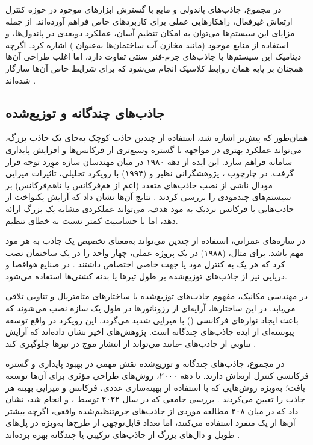در مجموع، جاذب‌های پاندولی و مایع با گسترش ابزارهای موجود در حوزه کنترل ارتعاش غیرفعال، راهکارهایی عملی برای کاربردهای خاص فراهم آورده‌اند. از جمله مزایای این سیستم‌ها می‌توان به امکان تنظیم آسان، عملکرد دوبعدی در پاندول‌ها، و استفاده از منابع موجود (مانند مخازن آب ساختمان‌ها به‌عنوان ) اشاره کرد. اگرچه دینامیک این سیستم‌ها با جاذب‌های جرم-فنر سنتی تفاوت دارد، اما اغلب طراحی آن‌ها همچنان بر پایه همان روابط کلاسیک انجام می‌شود که برای شرایط خاص آن‌ها سازگار شده‌اند \cite{sun1995properties, zhang2022understanding, kashani2018numerical, frandsen2005numerical, zhang2015nonlinear}.

\subsection{جاذب‌های چندگانه و توزیع‌شده}

همان‌طور که پیش‌تر اشاره شد، استفاده از چندین جاذب کوچک به‌جای یک جاذب بزرگ، می‌تواند عملکرد بهتری در مواجهه با گستره وسیع‌تری از فرکانس‌ها و افزایش پایداری سامانه فراهم سازد. این ایده از دهه ۱۹۸۰ در میان مهندسان سازه مورد توجه قرار گرفت. در چارچوب ، پژوهشگرانی نظیر  و  (۱۹۹۴) با رویکرد تحلیلی، تأثیرات میرایی مودال ناشی از نصب جاذب‌های متعدد (اعم از هم‌فرکانس یا ناهم‌فرکانس) بر سیستم‌های چندمودی را بررسی کردند \cite{igusa1994vibration}. نتایج آن‌ها نشان داد که آرایش یکنواخت از جاذب‌هایی با فرکانس نزدیک به مود هدف، می‌تواند عملکردی مشابه یک  بزرگ ارائه دهد، اما با حساسیت کمتر نسبت به خطای تنظیم.

در سازه‌های عمرانی، استفاده از چندین  می‌تواند به‌معنای تخصیص یک جاذب به هر مود مهم باشد. برای مثال،  (۱۹۸۸) در یک پروژه عملی، چهار واحد  را در یک ساختمان نصب کرد که هر یک به کنترل مود یا جهت خاصی اختصاص داشتند \cite{clark1988multiple}. در صنایع هوافضا و دریایی نیز از جاذب‌های توزیع‌شده بر طول تیرها یا بدنه کشتی‌ها استفاده می‌شود.

در مهندسی مکانیک، مفهوم جاذب‌های توزیع‌شده با ساختارهای متامتریال و تناوبی تلاقی می‌یابد. در این ساختارها، آرایه‌ای از رزوناتورها در طول یک سازه نصب می‌شوند که باعث ایجاد نوارهای فرکانسی () با میرایی شدید می‌گردد. این رویکرد در واقع توسعه پیوسته‌ای از ایده جاذب‌های چندگانه است. پژوهش‌های اخیر نشان داده‌اند که آرایش تناوبی از جاذب‌های -مانند می‌تواند از انتشار موج در تیرها جلوگیری کند \cite{nouh2014vibration, aladwani2020mechanics, pai2014acoustic, chavan2023programming}.

در مجموع، جاذب‌های چندگانه و توزیع‌شده نقش مهمی در بهبود پایداری و گستره فرکانسی کنترل ارتعاش دارند. تا دهه ۲۰۰۰، روش‌های طراحی مؤثری برای آن‌ها توسعه یافت؛ به‌ویژه روش‌هایی که با استفاده از بهینه‌سازی عددی، فرکانس و میرایی بهینه هر جاذب را تعیین می‌کردند \cite{zuo2005optimization, yang2015optimal, chun2015h, mayer2010approaches}. بررسی جامعی که در سال ۲۰۲۲ توسط ،  و  انجام شد، نشان داد که در میان ۲۰۸ مطالعه موردی از جاذب‌های جرم‌تنظیم‌شده واقعی، اگرچه بیشتر آن‌ها از یک  منفرد استفاده می‌کنند، اما تعداد قابل‌توجهی از طرح‌ها به‌ویژه در پل‌های طویل و دال‌های بزرگ از جاذب‌های ترکیبی یا چندگانه بهره برده‌اند \cite{koutsoloukas2022passive}.

